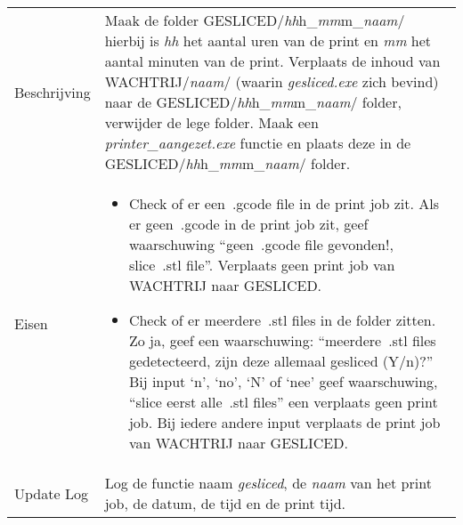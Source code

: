 \documentclass{article}
\newcommand{\quotes}[1]{``#1''}
\begin{document}
\begin{table}[H]
    \centering
    \begin{tabular}%
    {>{\raggedright\arraybackslash}p{}%
    |>{\raggedright\arraybackslash}p{}}
    \rowcolor{myblue} \multicolumn{2}{c}{\rule{0pt}{13pt}Functie: {\Large gesliced.exe}} \\\hline
    Beschrijving & Maak de folder GESLICED/\textit{hh}h\_\textit{mm}m\_\textit{naam}/ hierbij is \textit{hh} het aantal uren van de print en \textit{mm} het aantal minuten van de print. Verplaats de inhoud van WACHTRIJ/\textit{naam}/ (waarin \textit{gesliced.exe} zich bevind) naar de GESLICED/\textit{hh}h\_\textit{mm}m\_\textit{naam}/ folder, verwijder de lege folder. Maak een \textit{printer\_aangezet.exe} functie en plaats deze in de GESLICED/\textit{hh}h\_\textit{mm}m\_\textit{naam}/ folder.\\
    Eisen & 
    \begin{itemize} 
      \item Check of er een~.gcode file in de print job zit. Als er geen~.gcode in de print job zit, geef waarschuwing \quotes{geen~.gcode file gevonden!, slice~.stl file}. Verplaats geen print job van WACHTRIJ naar GESLICED.
\item Check of er meerdere~.stl files in de folder zitten. Zo ja, geef een waarschuwing: \quotes{meerdere~.stl files gedetecteerd, zijn deze allemaal gesliced (Y/n)?} Bij input `n', `no', `N' of `nee' geef waarschuwing, \quotes{slice eerst alle~.stl files} een verplaats geen print job. Bij iedere andere input verplaats de print job van WACHTRIJ naar GESLICED.  
\end{itemize} \\
    Update Log& Log de functie naam \textit{gesliced}, de \textit{naam} van het print job, de datum, de tijd en de print tijd.\\
    \end{tabular}
\end{table}
\end{document}
